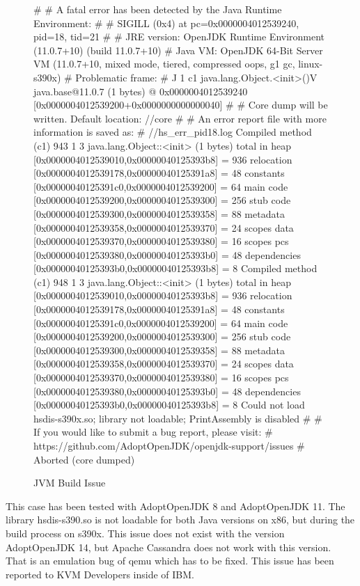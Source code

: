 \begin{figure}[H]
\centering
\begin{boxedverbatim}
#
# A fatal error has been detected by the Java Runtime Environment:
#
#  SIGILL (0x4) at pc=0x0000004012539240, pid=18, tid=21
#
# JRE version: OpenJDK Runtime Environment (11.0.7+10) (build 11.0.7+10)
# Java VM: OpenJDK 64-Bit Server VM (11.0.7+10, mixed mode, tiered, compressed oops, 
g1 gc, linux-s390x)
# Problematic frame:
# J 1 c1 java.lang.Object.<init>()V java.base@11.0.7 (1 bytes) @ 0x0000004012539240 
[0x0000004012539200+0x0000000000000040]
#
# Core dump will be written. Default location: //core
#
# An error report file with more information is saved as:
# //hs_err_pid18.log
Compiled method (c1)     943    1       3       java.lang.Object::<init> (1 bytes)
 total in heap  [0x0000004012539010,0x00000040125393b8] = 936
 relocation     [0x0000004012539178,0x00000040125391a8] = 48
 constants      [0x00000040125391c0,0x0000004012539200] = 64
 main code      [0x0000004012539200,0x0000004012539300] = 256
 stub code      [0x0000004012539300,0x0000004012539358] = 88
 metadata       [0x0000004012539358,0x0000004012539370] = 24
 scopes data    [0x0000004012539370,0x0000004012539380] = 16
 scopes pcs     [0x0000004012539380,0x00000040125393b0] = 48
 dependencies   [0x00000040125393b0,0x00000040125393b8] = 8
Compiled method (c1)     948    1       3       java.lang.Object::<init> (1 bytes)
 total in heap  [0x0000004012539010,0x00000040125393b8] = 936
 relocation     [0x0000004012539178,0x00000040125391a8] = 48
 constants      [0x00000040125391c0,0x0000004012539200] = 64
 main code      [0x0000004012539200,0x0000004012539300] = 256
 stub code      [0x0000004012539300,0x0000004012539358] = 88
 metadata       [0x0000004012539358,0x0000004012539370] = 24
 scopes data    [0x0000004012539370,0x0000004012539380] = 16
 scopes pcs     [0x0000004012539380,0x00000040125393b0] = 48
 dependencies   [0x00000040125393b0,0x00000040125393b8] = 8
Could not load hsdis-s390x.so; library not loadable; PrintAssembly is disabled
#
# If you would like to submit a bug report, please visit:
#   https://github.com/AdoptOpenJDK/openjdk-support/issues
#
Aborted (core dumped) 
\end{boxedverbatim}
 \caption{JVM Build Issue}
    \label{jvm-issue}
\end{figure}

This case has been tested with AdoptOpenJDK 8 and AdoptOpenJDK 11. The library hsdis-s390.so is not loadable for both Java versions on x86, but during the build process on s390x. This issue does not exist with the version AdoptOpenJDK 14, but Apache Cassandra does not work with this version. \\
That is an emulation bug of qemu which has to be fixed. This issue has been reported to KVM Developers inside of IBM. \\

